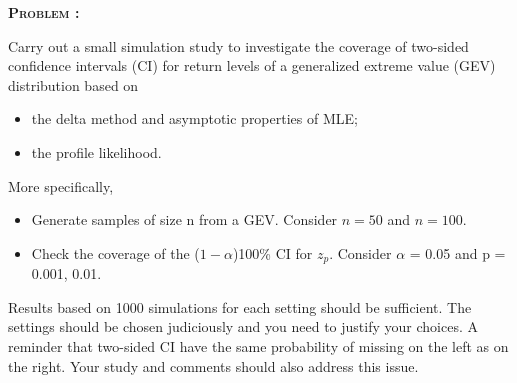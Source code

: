 \documentclass[12pt,oneside]{article}
\newenvironment{problem}[1]
{\begin{mdframed}
        \textbf{\textsc{Problem #1:}}
}
{\end{mdframed}}
\begin{document}




\begin{problem}{}
Carry out a small simulation study to investigate the coverage of two-sided confidence intervals (CI) for return levels of a generalized extreme value (GEV) distribution based on
\begin{itemize}
    \item the delta method and asymptotic properties of MLE;
    \item the profile likelihood.
\end{itemize}
More specifically,
\begin{itemize}
    \item Generate samples of size n from a GEV. Consider $n = 50$ and $n = 100$.
    \item Check the coverage of the ($1 - \alpha$)100\% CI for $z_p$. Consider $\alpha$ = 0.05 and p = 0.001, 0.01.
\end{itemize}
Results based on 1000 simulations for each setting should be sufficient. The settings should
be chosen judiciously and you need to justify your choices. A reminder that two-sided CI
have the same probability of missing on the left as on the right. Your study and comments
should also address this issue.
\end{problem}
\end{document}
